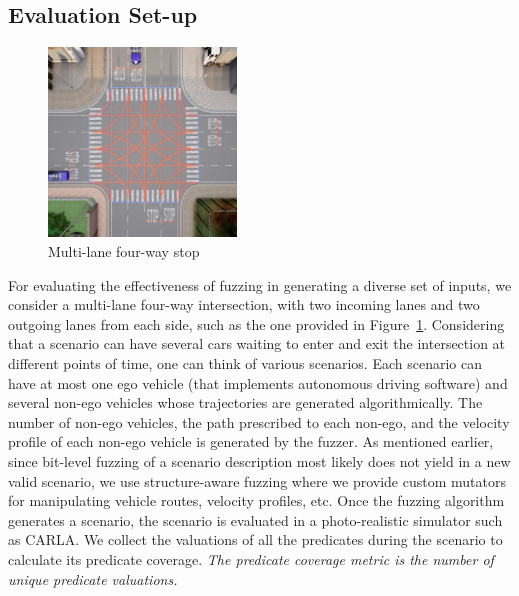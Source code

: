\subsection{Evaluation Set-up}

\begin{figure}
    \centering
    \includegraphics[width=50mm]{figures/chapter5/4way-stopOnAll.jpg}
    \caption{Multi-lane four-way stop}
    \label{fig:4way-stopOnAll}
\end{figure}

For evaluating the effectiveness of fuzzing in generating a diverse set of inputs, we consider a multi-lane four-way intersection, with two incoming lanes and two outgoing lanes from each side, such as the one provided in Figure~\ref{fig:4way-stopOnAll}.
% 
Considering that a scenario can have several cars waiting to enter and exit the intersection at different points of time, one can think of various scenarios.
% 
Each scenario can have at most one ego vehicle (that implements autonomous driving software) and several non-ego vehicles whose trajectories are generated algorithmically.
% 
The number of non-ego vehicles, the path prescribed to each non-ego, and the velocity profile of each non-ego vehicle is generated by the fuzzer.
% 
As mentioned earlier, since bit-level fuzzing of a scenario description most likely does not yield in a new valid scenario, we use structure-aware fuzzing where we provide custom mutators for manipulating vehicle routes, velocity profiles, etc.
% 
Once the fuzzing algorithm generates a scenario, the scenario is evaluated in a photo-realistic simulator such as CARLA.
% 
We collect the valuations of all the predicates during the scenario to calculate its predicate coverage.
% 
\emph{The predicate coverage metric is the number of unique predicate valuations.}
% 


